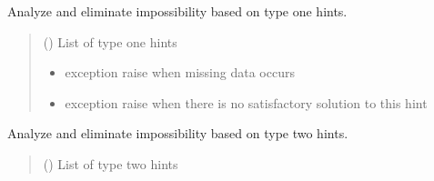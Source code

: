 \documentclass[letterpaper,10pt,english]{sphinxmanual}
\begin{document}
\begin{fulllineitems}
\begin{fulllineitems}
\begin{quote}
\begin{description}
\end{description}\end{quote}

\end{fulllineitems}


\begin{fulllineitems}
\label{\detokenize{condition_analysis:condition_analysis.CondBoard.topCond}}
\pysigstartsignatures
{}
\pysigstopsignatures
\sphinxAtStartPar
Analyze and eliminate impossibility based on type one hints.
\begin{quote}\begin{description}
\sphinxAtStartPar
{} () \textendash{} List of type one hints

\begin{itemize}
\item {} 
\sphinxAtStartPar
{} \textendash{} exception \sphinxhyphen{} raise when missing data occurs

\item {} 
\sphinxAtStartPar
{} \textendash{} exception \sphinxhyphen{} raise when there is no             satisfactory solution to this hint

\end{itemize}

\end{description}\end{quote}

\end{fulllineitems}


\begin{fulllineitems}
\label{\detokenize{condition_analysis:condition_analysis.CondBoard.botCond}}
\pysigstartsignatures
{}
\pysigstopsignatures
\sphinxAtStartPar
Analyze and eliminate impossibility based on type two hints.
\begin{quote}\begin{description}
\sphinxAtStartPar
{} () \textendash{} List of type two hints


\end{description}
\end{quote}
\end{fulllineitems}
\end{fulllineitems}
\end{document}
